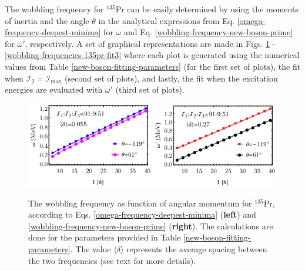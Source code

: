 The wobbling frequency for $^{135}$Pr can be easily determined by using the moments of inertia and the angle $\theta$ in the analytical expressions from Eq. \ref{omega-frequency-deepest-minima} for $\omega$ and Eq. \ref{wobbling-frequency-new-boson-prime} for $\omega'$, respectively. A set of graphical representations are made in Figs. \ref{wobbling-frequencies-135pr-fit1} - \ref{wobbling-frequencies-135pr-fit3} where each plot is generated using the numerical values from Table \ref{new-boson-fitting-parameters} (for the first set of plots), the fit when $\mathcal{I}_2=\mathcal{I}_\text{max}$ (second set of plots), and lastly, the fit when the excitation energies are evaluated with $\omega'$ (third set of plots).
\begin{figure}
    \centering
    \includegraphics[width=0.49\textwidth]{Chapters/Figures/omega-fit-1.pdf}
    \includegraphics[width=0.49\textwidth]{Chapters/Figures/omega-prime-fit-1.pdf}
    \caption{The wobbling frequency as function of angular momentum for $^{135}$Pr, according to Eqs. \ref{omega-frequency-deepest-minima} (\textbf{left}) and \ref{wobbling-frequency-new-boson-prime} (\textbf{right}). The calculations are done for the parameters provided in Table \ref{new-boson-fitting-parameters}. The value $\langle\delta\rangle$ represents the average spacing between the two frequencies (see text for more details).}
    \label{wobbling-frequencies-135pr-fit1}
\end{figure}
